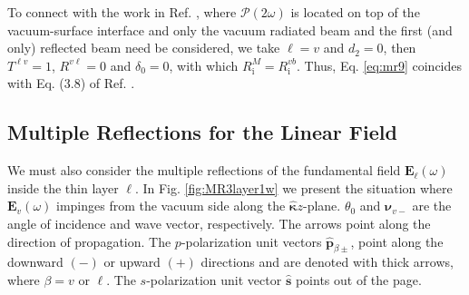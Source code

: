 \documentclass[aps,pra,10pt,amsmath,twocolumn,letterpaper]{revtex4-1}
\begin{document}
To connect with the work in Ref. \cite{mizrahiJOSA88}, where
$\boldsymbol{\mathcal{P}}(2\omega)$ is located on top of the vacuum-surface
interface and only the vacuum radiated beam and the first (and only) reflected
beam need be considered, we take $\ell = v$ and $d_{2} = 0$, then $T^{\ell v} =
1$, $R^{v\ell} = 0$ and $\delta_{0} = 0$, with which $R^{M}_{\mathrm{i}} =
R^{vb}_{\mathrm{i}}$. Thus, Eq. \eqref{eq:mr9} coincides with Eq. (3.8) of Ref.
\cite{mizrahiJOSA88}.



\subsection{Multiple Reflections for the Linear Field}

We must also consider the multiple reflections of the fundamental field
$\mathbf{E}_{\ell}(\omega)$ inside the thin layer $\ell$. In Fig.
\ref{fig:MR3layer1w} we present the situation where $\mathbf{E}_{v}(\omega)$
impinges from the vacuum side along the $\hat{\boldsymbol{\kappa}}z$-plane.
$\theta_{0}$ and $\boldsymbol{\nu}_{v-}$ are the angle of incidence and wave
vector, respectively. The arrows point along the direction of propagation. The
$p$-polarization unit vectors $\hat{\mathbf{p}}_{\beta\pm}$, point along the
downward $(-)$ or upward $(+)$ directions and are denoted with thick arrows,
where $\beta = v$ or $\ell$. The $s$-polarization unit vector $\hat{\mathbf{s}}$
points out of the page.
\end{document}
